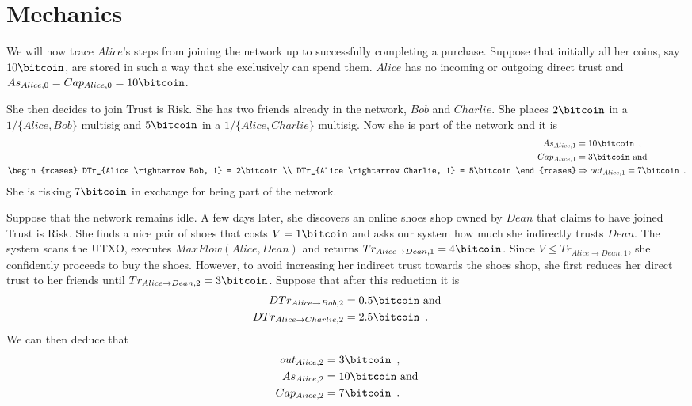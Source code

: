 \section{Mechanics}
  We will now trace $Alice$'s steps from joining the network up to successfully completing a purchase. Suppose that initially
  all her coins, say $10\bitcoin$, are stored in such a way that she exclusively can spend them. $Alice$ has no incoming or
  outgoing direct trust and $As_{Alice, 0} = Cap_{Alice, 0} = 10\bitcoin$.

  She then decides to join Trust is Risk. She has two friends already in the network, $Bob$ and $Charlie$. She places
  $2\bitcoin$ in a $1/\{Alice, Bob\}$ multisig and $5\bitcoin$ in a $1/\{Alice, Charlie\}$ multisig. Now she is part of the
  network and it is
  \begin{align*}
    As_{Alice, 1} &= 10\bitcoin \enspace, \\
    Cap_{Alice, 1} &= 3\bitcoin \mbox{ and} \\
    \begin{rcases}
      DTr_{Alice \rightarrow Bob, 1} = 2\bitcoin \\
      DTr_{Alice \rightarrow Charlie, 1} = 5\bitcoin
    \end{rcases}
    &\Rightarrow out_{Alice, 1} = 7\bitcoin \enspace.
  \end{align*}
  She is risking $7\bitcoin$ in exchange for being part of the network.

  Suppose that the network remains idle. A few days later, she discovers an online shoes shop owned by $Dean$ that claims to
  have joined Trust is Risk. She finds a nice pair of shoes that costs $V = 1\bitcoin$ and asks our system how much she
  indirectly trusts $Dean$. The system scans the UTXO, executes $MaxFlow(Alice, Dean)$ and returns
  $Tr_{Alice \rightarrow Dean, 1} = 4\bitcoin$. Since $V \leq Tr_{Alice \rightarrow Dean, 1}$, she confidently proceeds to
  buy the shoes. However, to avoid increasing her indirect trust towards the shoes shop, she first reduces her direct trust
  to her friends until $Tr_{Alice \rightarrow Dean, 2} = 3\bitcoin$. Suppose that after this reduction it is
  \begin{align*}
    DTr_{Alice \rightarrow Bob, 2} &= 0.5\bitcoin \mbox{ and} \\
    DTr_{Alice \rightarrow Charlie, 2} &= 2.5\bitcoin \enspace.
  \end{align*}
  We can then deduce that
  \begin{align*}
    out_{Alice, 2} &= 3\bitcoin \enspace, \\
    As_{Alice, 2} &= 10\bitcoin \mbox{ and} \\
    Cap_{Alice, 2} &= 7\bitcoin \enspace.
  \end{align*}

